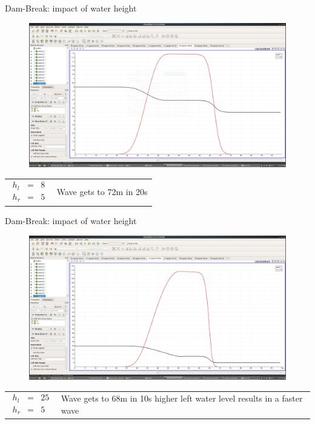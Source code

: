 \documentclass[shortpres]{beamer}
\newcommand{\imgvoffset}{-20pt}
\newcommand{\imgfullscale}{0.75}
\begin{document}
\begin{frame}{Dam-Break: impact of water height}
	\begin{figure}[t]
		\vspace{\imgvoffset}
		\includegraphics[width=\imgfullscale\linewidth]{img/Dam_hl8_hr5.png}
		\caption*{}
	\end{figure}
	
	\begin{tabular}{m{3cm} m{\linewidth-5cm}}
		$
		\begin{matrix}
		h_l & = & 8\\
		h_r & = & 5
		\end{matrix}
		$
		&
		
		Wave gets to 72m in 20s
	\end{tabular}
\end{frame}

\begin{frame}{Dam-Break: impact of water height}
	\begin{figure}[t]
		\vspace{\imgvoffset}
		\includegraphics[width=\imgfullscale\linewidth]{img/Dam_hl25_hr5.png}
		\caption*{ }
	\end{figure}
	
	\begin{tabular}{m{3cm} m{\linewidth-5cm}}
		$
		\begin{matrix}
		h_l & = & 25\\
		h_r & = & 5
		\end{matrix}
		$
		&
		
		Wave gets to 68m in 10s
		\newline \rightarrow higher left water level results in a faster wave
	\end{tabular}
\end{frame}
\end{document}
